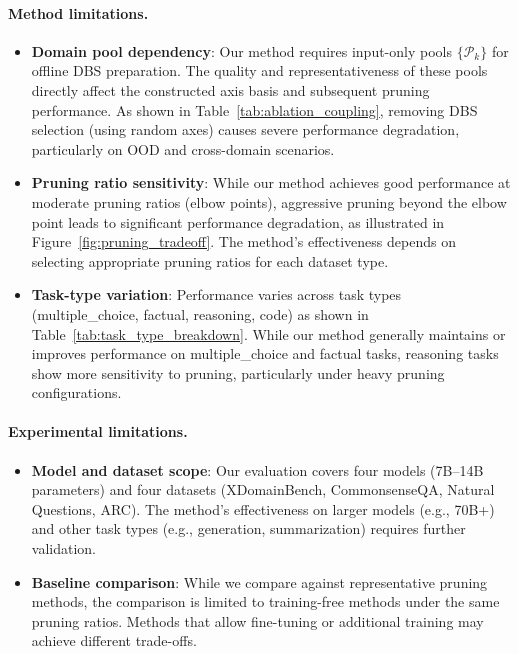 \paragraph{Method limitations.}
\begin{itemize}
    \item \textbf{Domain pool dependency}: Our method requires input-only pools $\{\mathcal{P}_k\}$ for offline DBS preparation.
    The quality and representativeness of these pools directly affect the constructed axis basis and subsequent pruning performance.
    As shown in Table~\ref{tab:ablation_coupling}, removing DBS selection (using random axes) causes severe performance degradation, particularly on OOD and cross-domain scenarios.
    \item \textbf{Pruning ratio sensitivity}: While our method achieves good performance at moderate pruning ratios (elbow points), aggressive pruning beyond the elbow point leads to significant performance degradation, as illustrated in Figure~\ref{fig:pruning_tradeoff}.
    The method's effectiveness depends on selecting appropriate pruning ratios for each dataset type.
    \item \textbf{Task-type variation}: Performance varies across task types (multiple\_choice, factual, reasoning, code) as shown in Table~\ref{tab:task_type_breakdown}.
    While our method generally maintains or improves performance on multiple\_choice and factual tasks, reasoning tasks show more sensitivity to pruning, particularly under heavy pruning configurations.
\end{itemize}

\paragraph{Experimental limitations.}
\begin{itemize}
    \item \textbf{Model and dataset scope}: Our evaluation covers four models (7B--14B parameters) and four datasets (XDomainBench, CommonsenseQA, Natural Questions, ARC).
    The method's effectiveness on larger models (e.g., 70B+) and other task types (e.g., generation, summarization) requires further validation.
    \item \textbf{Baseline comparison}: While we compare against representative pruning methods, the comparison is limited to training-free methods under the same pruning ratios.
    Methods that allow fine-tuning or additional training may achieve different trade-offs.
\end{itemize}

